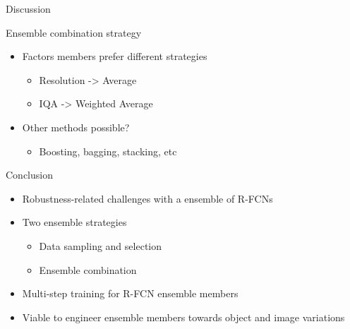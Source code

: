 \begin{frame}{Discussion}{}
    \begin{block}{Ensemble combination strategy}
        \begin{itemize}
            \item Factors members prefer different strategies
            \begin{itemize}
                \item Resolution -> Average
                \item IQA -> Weighted Average
            \end{itemize}
            \item Other methods possible?
            \begin{itemize}
                \item Boosting, bagging, stacking, etc
            \end{itemize} 
        \end{itemize} 
    \end{block} 
\end{frame}

\begin{frame}{Conclusion}{}
    \begin{block}{}
        \begin{itemize}
            \item Robustness-related challenges with a ensemble of R-FCNs
            \item Two ensemble strategies
            \begin{itemize}
                \item Data sampling and selection
                \item Ensemble combination
            \end{itemize}
            \item Multi-step training for R-FCN ensemble members
            \item Viable to engineer ensemble members towards object and image variations
        \end{itemize} 
    \end{block} 
\end{frame}